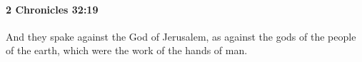 
		\paragraph{2 Chronicles 32:19} %
			\label{2CHRONICLES-32-19}

			And they spake against the God of Jerusalem, as against the gods of the people of the earth, which were the work of the hands of man.


